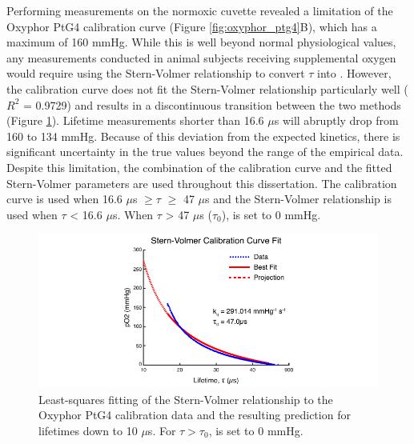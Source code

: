 Performing measurements on the normoxic cuvette revealed a limitation of the Oxyphor PtG4 calibration curve (Figure \ref{fig:oxyphor_ptg4}B), which has a maximum  of 160 mmHg. While this is well beyond normal physiological values, any measurements conducted in animal subjects receiving supplemental oxygen would require using the Stern-Volmer relationship to convert $\tau$ into . However, the calibration curve does not fit the Stern-Volmer relationship particularly well ($R^2$ = 0.9729) and results in a discontinuous transition between the two methods (Figure \ref{fig:sternvolmerfit}). Lifetime measurements shorter than 16.6 $\mu$s will abruptly drop from 160 to 134 mmHg. Because of this deviation from the expected kinetics, there is significant uncertainty in the true  values beyond the range of the empirical data. Despite this limitation, the combination of the calibration curve and the fitted Stern-Volmer parameters are used throughout this dissertation. The calibration curve is used when 16.6 $\mu$s $\ge \tau$ $\ge$ 47 $\mu$s and the Stern-Volmer relationship is used when $\tau$ \textless{} 16.6 $\mu$s. When $\tau$ \textgreater{} 47 $\mu$s ($\tau_0$),  is set to 0 mmHg.

\begin{figure}
    \includegraphics{figures/chapter_2/sternvolmerfit.pdf}
    \caption {
        \label{fig:sternvolmerfit}
        Least-squares fitting of the Stern-Volmer relationship to the Oxyphor PtG4 calibration data and the resulting prediction for lifetimes down to 10 $\mu$s. For $\tau > \tau_0$,  is set to 0 mmHg.
    }
\end{figure}



